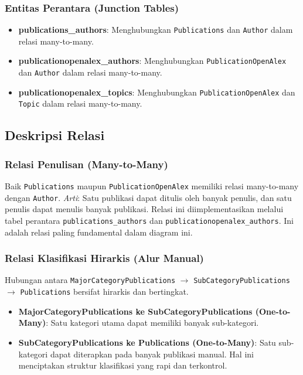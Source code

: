 \subsubsection*{Entitas Perantara (Junction Tables)}
\begin{itemize}
    \item \textbf{publications\_authors}: Menghubungkan \texttt{Publications} dan \texttt{Author} 
    dalam relasi many-to-many.
    
    \item \textbf{publicationopenalex\_authors}: Menghubungkan \texttt{PublicationOpenAlex} 
    dan \texttt{Author} dalam relasi many-to-many.
    
    \item \textbf{publicationopenalex\_topics}: Menghubungkan \texttt{PublicationOpenAlex} 
    dan \texttt{Topic} dalam relasi many-to-many.
\end{itemize}


\subsection{Deskripsi Relasi}

\subsubsection*{Relasi Penulisan (Many-to-Many)}
Baik \texttt{Publications} maupun \texttt{PublicationOpenAlex} memiliki relasi many-to-many dengan \texttt{Author}.  
\textit{Arti}: Satu publikasi dapat ditulis oleh banyak penulis, dan satu penulis dapat menulis banyak publikasi.  
Relasi ini diimplementasikan melalui tabel perantara \texttt{publications\_authors} dan 
\texttt{publicationopenalex\_authors}. Ini adalah relasi paling fundamental dalam diagram ini.

\subsubsection*{Relasi Klasifikasi Hirarkis (Alur Manual)}
Hubungan antara \texttt{MajorCategoryPublications} $\rightarrow$ 
\texttt{SubCategoryPublications} $\rightarrow$ \texttt{Publications} bersifat hirarkis dan bertingkat.

\begin{itemize}
    \item \textbf{MajorCategoryPublications ke SubCategoryPublications (One-to-Many)}:  
    Satu kategori utama dapat memiliki banyak sub-kategori.
    
    \item \textbf{SubCategoryPublications ke Publications (One-to-Many)}:  
    Satu sub-kategori dapat diterapkan pada banyak publikasi manual.  
    Hal ini menciptakan struktur klasifikasi yang rapi dan terkontrol.
\end{itemize}

